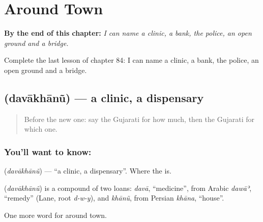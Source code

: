 
\chapter{Around Town}
\label{ch:gu-around-town}

\begin{chapteropening}
\textbf{By the end of this chapter:} \emph{I can name a clinic, a bank, the police, an open ground and a bridge.}

Complete the last lesson of chapter 84: I can name a clinic, a bank, the police, an open ground and a bridge.
\end{chapteropening}

\section[\texorpdfstring{\gu{દવાખાનું} (davākhānũ)}{દવાખાનું (davākhānũ)}]{ (davākhānũ) — a clinic, a dispensary}

\label{lesson:GU-C84-clinic}



\begin{quote}
Before the new one: say the Gujarati for how much, then the Gujarati for which one.
\end{quote}

\subsection*{You'll want to know: }
\textbf{} (\emph{davākhānũ}) — \textquotedblleft{}a clinic, a dispensary\textquotedblright{}. Where the \textbf{} is.

\begin{cousinweb}
\textbf{} (\emph{davākhānũ}) is a compound of two loans: \emph{davā}, \textquotedblleft{}medicine\textquotedblright{}, from Arabic \emph{dawāʾ}, \textquotedblleft{}remedy\textquotedblright{} (Lane, root \emph{d-w-y}), and \emph{khānũ}, from Persian \emph{khāna}, \textquotedblleft{}house\textquotedblright{}.
\end{cousinweb}

\begin{grammarlens}[title={What you've built}]
One more word for around town.
\end{grammarlens}

